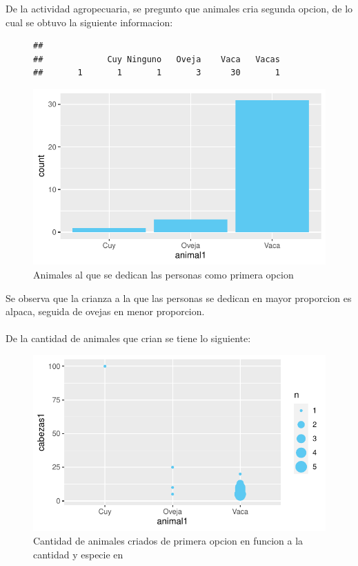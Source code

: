 \documentclass[12pt]{article}\usepackage[]{graphicx}\usepackage[]{xcolor}
\makeatletter
\def\maxwidth{ %
  \ifdim\Gin@nat@width>\linewidth
    \linewidth
  \else
    \Gin@nat@width
  \fi
}
\newenvironment{kframe}{%
 \def\at@end@of@kframe{}%
 \ifinner\ifhmode%
  \def\at@end@of@kframe{\end{minipage}}%
  \begin{minipage}{\columnwidth}%
 \fi\fi%
 \def\FrameCommand##1{\hskip\@totalleftmargin \hskip-\fboxsep
 \colorbox{shadecolor}{##1}\hskip-\fboxsep
     \hskip-\linewidth \hskip-\@totalleftmargin \hskip\columnwidth}%
 \MakeFramed {\advance\hsize-\width
   \@totalleftmargin\z@ \linewidth\hsize
   \@setminipage}}%
 {\par\unskip\endMakeFramed%
 \at@end@of@kframe}
\newenvironment{knitrout}{}{} %
\makeatother
\begin{document}
	
	De la actividad agropecuaria, se pregunto que animales cria segunda opcion, de lo cual se obtuvo la siguiente informacion:
	\begin{figure}[H]
	\centering
\begin{knitrout}
\color{fgcolor}\begin{kframe}
\begin{verbatim}
## 
##             Cuy Ninguno   Oveja    Vaca   Vacas 
##       1       1       1       3      30       1
\end{verbatim}
\end{kframe}
\includegraphics[width=\maxwidth]{figure/fifteen-1} 
\end{knitrout}
	\caption{Animales al que se dedican las personas como primera opcion}
	\end{figure}
	Se observa que la crianza a la que las personas se dedican en mayor proporcion es alpaca, seguida de ovejas en menor proporcion.\\
	\\
	De la cantidad de animales que crian se tiene lo siguiente:
	\begin{figure}[H]
	\centering
\begin{knitrout}
\color{fgcolor}
\includegraphics[width=\maxwidth]{figure/sixteen-1} 
\end{knitrout}
	\caption{Cantidad de animales criados de primera opcion en funcion a la cantidad y especie en \comunidad}
	\end{figure}
	
\end{document}
